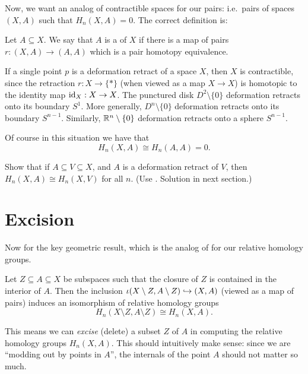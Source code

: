 Now, we want an analog of contractible spaces for our pairs:
i.e.\ pairs of spaces $(X,A)$ such that $H_n(X,A) = 0$.
The correct definition is:
\begin{definition}
	Let $A \subseteq X$.
	We say that $A$ is a  of $X$
	if there is a map of pairs $r : (X, A) \to (A, A)$
	which is a pair homotopy equivalence.
\end{definition}
\begin{example}
	\listhack
	\begin{enumerate}[(a)]
		\ii If a single point $p$ is a deformation retract of a space $X$,
		then $X$ is contractible, since the retraction $r : X \to \{\ast\}$
		(when viewed as a map $X \to X$)
		is homotopic to the identity map $\mathrm{id}_X : X \to X$.
		\ii The punctured disk $D^2 \setminus \{0\}$
		deformation retracts onto its boundary $S^1$.
		\ii More generally, $D^{n} \setminus \{0\}$
		deformation retracts onto its boundary $S^{n-1}$.
		\ii Similarly, $\mathbb R^n \setminus \{0\}$
		deformation retracts onto a sphere $S^{n-1}$.
	\end{enumerate}
\end{example}
Of course in this situation we have that
\[ H_n(X,A) \cong H_n(A,A) = 0. \]

\begin{exercise}
	Show that if $A \subseteq V \subseteq X$,
	and $A$ is a deformation retract of $V$,
	then $H_n(X,A) \cong H_n(X,V)$ for all $n$.
	(Use . Solution in next section.)
\end{exercise}

\section{Excision}
Now for the key geometric result, which is the analog of
 for our relative homology groups.
\begin{theorem}
	[Excision]
	Let $Z \subseteq A \subseteq X$ be subspaces such that
	the closure of $Z$ is contained in the interior of $A$.
	Then the inclusion $\iota (X \setminus Z, A \setminus Z) \hookrightarrow (X,A)$
	(viewed as a map of pairs) induces an isomorphism of
	relative homology groups
	\[ H_n(X \setminus Z, A \setminus Z) \cong H_n(X,A). \]
\end{theorem}
This means we can \emph{excise} (delete) a subset $Z$ of $A$ in computing
the relative homology groups $H_n(X,A)$.
This should intuitively make sense:
since we are ``modding out by points in $A$'',
the internals of the point $A$ should not matter so much.

